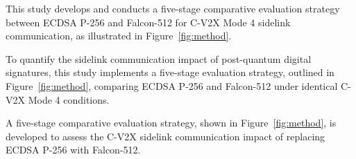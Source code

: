 %
%
%

This study develops and conducts a five-stage comparative evaluation strategy between ECDSA P-256 and Falcon-512 for C-V2X Mode 4 sidelink communication, as illustrated in Figure~\ref{fig:method}.

To quantify the sidelink communication impact of post-quantum digital signatures, this study implements a five-stage evaluation strategy, outlined in Figure~\ref{fig:method}, comparing ECDSA P-256 and Falcon-512 under identical C-V2X Mode 4 conditions.

A five-stage comparative evaluation strategy, shown in Figure~\ref{fig:method}, is developed to assess the C-V2X sidelink communication impact of replacing ECDSA P-256 with Falcon-512.
